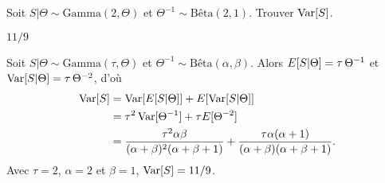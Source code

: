 
\begin{exercice}
  Soit $S|\Theta \sim \text{Gamma}(2, \Theta)$ et $\Theta^{-1} \sim
  \text{Bêta}(2, 1)$. Trouver $\operatorname{Var} [ S ]$.
  \begin{rep}
    $11/9$
  \end{rep}
  \begin{sol}
    Soit $S|\Theta \sim \text{Gamma}(\tau, \Theta)$ et $\Theta^{-1} \sim
    \text{Bêta}(\alpha, \beta)$. Alors $E [ S|\Theta ] = \tau\,
    \Theta^{-1}$ et $\operatorname{Var} [ S|\Theta ] = \tau\, \Theta^{-2}$, d'où
    \begin{align*}
      \operatorname{Var} [ S ]
      &= \operatorname{Var} [ E [ S|\Theta ] ] + E [ \operatorname{Var} [ S|\Theta ] ] \\
      &= \tau^2 \operatorname{Var} [ \Theta^{-1} ] + \tau E [ \Theta^{-2} ] \\
      &= \frac{\tau^2 \alpha \beta}{(\alpha+\beta)^2(\alpha+\beta+1)} +
         \frac{\tau \alpha (\alpha+1)}{(\alpha+\beta)(\alpha+\beta+1)}.
     \end{align*}
     Avec $\tau = 2$, $\alpha = 2$ et $\beta = 1$, $\operatorname{Var} [ S ] = 11/9$.
  \end{sol}
\end{exercice}

